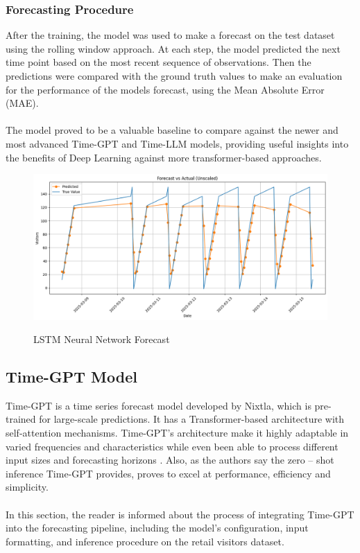 \documentclass{article}
\begin{document}
\newpage
\subsubsection{Forecasting Procedure}
After the training, the model was used to make a forecast on the test dataset using the rolling window approach. At each step, the model predicted the next time point based  on the most recent sequence of observations. Then the predictions were compared with the ground truth values to make an evaluation for the performance of the models forecast, using the Mean Absolute Error (MAE). \\
\\
The model proved to be a valuable baseline to compare against the newer and most advanced Time-GPT and Time-LLM models, providing useful insights into the benefits of Deep Learning against more transformer-based approaches.

\begin{figure}[h]
\includegraphics[width=1\linewidth]{images/neural_forecast.png}
    \label{fig:mesh1}
    \caption{LSTM Neural Network Forecast}
\end{figure}

\newpage
\subsection{Time-GPT Model}
Time-GPT is a time series forecast  model developed by Nixtla, which is 
pre-trained for large-scale predictions. It has a Transformer-based architecture with self-attention mechanisms. Time-GPT's architecture make it highly adaptable in varied frequencies and characteristics while even been able to process different input sizes and forecasting horizons \cite{garza2024timegpt1}. Also, as the authors say the zero – shot inference Time-GPT provides, proves to excel at performance, efficiency and simplicity.\\
\\
In this section, the reader is informed about the process of integrating Time-GPT into the forecasting pipeline, including the model’s configuration, input formatting, and inference procedure on the retail visitors dataset.
\end{document}
